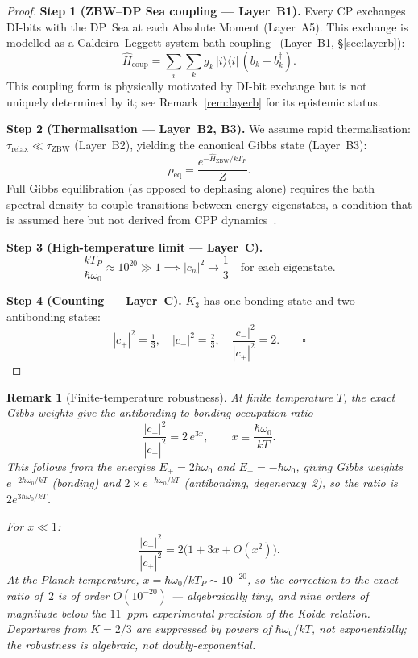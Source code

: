 \documentclass[11pt]{article}
\newtheorem{remark}{Remark}[section]
\newcommand{\ZBW}{\mathrm{ZBW}}
\begin{document}
\begin{proof}
\textbf{Step 1 (ZBW--DP Sea coupling --- Layer~B1).}
Every CP exchanges DI-bits with the DP~Sea at each Absolute Moment
(Layer~A5).  This exchange is modelled as a Caldeira--Leggett
system-bath coupling~\cite{caldeira1983} (Layer~B1, \S\ref{sec:layerb}):
\begin{equation}
\hat{H}_{\mathrm{coup}} = \sum_{i}\sum_k g_k\,|i\rangle\langle i|\,(b_k + b_k^\dagger).
\end{equation}
This coupling form is physically motivated by DI-bit exchange
but is not uniquely determined by it; see Remark~\ref{rem:layerb}
for its epistemic status.

\textbf{Step 2 (Thermalisation --- Layer~B2, B3).}
We assume rapid thermalisation: $\tau_{\mathrm{relax}} \ll
\tau_{\mathrm{ZBW}}$ (Layer~B2), yielding the canonical Gibbs
state (Layer~B3):
\begin{equation}
\rho_{\mathrm{eq}} = \frac{e^{-\hat{H}_\ZBW/kT_P}}{Z}.
\end{equation}
Full Gibbs equilibration (as opposed to dephasing alone) requires
the bath spectral density to couple transitions between energy
eigenstates, a condition that is assumed here but not derived
from CPP dynamics~\cite{breuer2002}.

\textbf{Step 3 (High-temperature limit --- Layer~C).}
\[
\frac{kT_P}{\hbar\omega_0} \approx 10^{20} \gg 1
\implies
|c_n|^2 \to \frac{1}{3} \quad\text{for each eigenstate}.
\]

\textbf{Step 4 (Counting --- Layer~C).}
$K_3$ has one bonding state and two antibonding states:
\[
|c_+|^2 = \tfrac{1}{3}, \quad
|c_-|^2 = \tfrac{2}{3}, \quad
\frac{|c_-|^2}{|c_+|^2} = 2. \qquad\square
\]
\end{proof}

\begin{remark}[Finite-temperature robustness]
\label{rem:robustness}
At finite temperature $T$, the exact Gibbs weights give the
antibonding-to-bonding occupation ratio
\begin{equation}
\frac{|c_-|^2}{|c_+|^2} = 2\,e^{3x},
\qquad x \equiv \frac{\hbar\omega_0}{kT}.
\label{eq:robustness}
\end{equation}
This follows from the energies $E_+ = 2\hbar\omega_0$ and
$E_- = -\hbar\omega_0$, giving Gibbs weights
$e^{-2\hbar\omega_0/kT}$ (bonding) and
$2\times e^{+\hbar\omega_0/kT}$ (antibonding, degeneracy~2),
so the ratio is $2e^{3\hbar\omega_0/kT}$.

For $x \ll 1$:
\begin{equation}
\frac{|c_-|^2}{|c_+|^2} = 2\bigl(1 + 3x + O(x^2)\bigr).
\end{equation}
At the Planck temperature, $x = \hbar\omega_0/kT_P \sim 10^{-20}$,
so the correction to the exact ratio of~$2$ is of order
$O(10^{-20})$ --- algebraically tiny, and nine orders of magnitude
below the $11$~ppm experimental precision of the Koide relation.
Departures from $K = 2/3$ are suppressed by powers of
$\hbar\omega_0/kT$, not exponentially; the robustness is
\emph{algebraic}, not doubly-exponential.
\end{remark}
\end{document}
